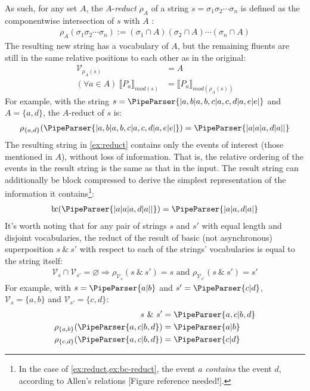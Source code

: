 \documentclass[a4paper,12pt,leqno]{article}
\newcommand{\bc}{{\rm b\!c}}
\newcommand{\vph}[1]{\vphantom{#1}}
\newcommand{\ebox}[1]{\fbox{$\vph{'(),}#1$}}
\renewcommand{\sp}{~\&~}
\renewcommand{\emptyset}{\varnothing}
\newcommand{\EventString}[1]{%
	\renewcommand*{\do}[1]{\ebox{##1}}%
	\PipeParser{#1}%
}
\newcommand{\refneeded}[1][]{{\color{red}[Figure reference needed!#1]}}
\begin{document}
As such, for any set $A$, the $A$-\textit{reduct} $\rho_A$ of a string $s=\sigma_1\sigma_2\cdots\sigma_n$ is defined as the componentwise intersection of $s$ with $A$ \citep{fernando2016regular,woods2018improving}:
\begin{align}
	\rho_A(\sigma_1\sigma_2\cdots\sigma_n) := (\sigma_1 \cap A)(\sigma_2 \cap A)\cdots(\sigma_n \cap A)
\end{align}
The resulting new string has a vocabulary of $A$, but the remaining fluents are still in the same relative positions to each other as in the original:
\begin{align}
	\mathcal{V}_{\rho_A(s)} &= A\\
	(\forall a \in A)~\llbracket P_a \rrbracket_{mod(s)} &= \llbracket P_a \rrbracket_{mod(\rho_A(s))}
\end{align}
For example, with the string $s = \EventString{{}|a,b|a,b,c|a,c,d|a,e|e|{}}$ and $A=\{a,d\}$, the $A$-reduct of $s$ is:
\begin{align}\label{ex:reduct}
	\rho_{\{a,d\}}(\EventString{{}|a,b|a,b,c|a,c,d|a,e|e|{}}) = \EventString{{}|a|a|a,d|a|{}|{}}
\end{align}
The resulting string in \cref{ex:reduct} contains only the events of interest (those mentioned in $A$), without loss of information. That is, the relative ordering of the events in the result string is the same as that in the input. The result string can additionally be block compressed to derive the simplest representation of the information it contains\footnote{In the case of \cref{ex:reduct,ex:bc-reduct}, the event $a$ \textit{contains} the event $d$, according to Allen's relations \citep{allen1983maintaining}\refneeded.}:
\begin{align}\label{ex:bc-reduct}
	\bc(\EventString{{}|a|a|a,d|a|{}|{}}) = \EventString{{}|a|a,d|a|{}}
\end{align}
It's worth noting that for any pair of strings $s$ and $s'$ with equal length and disjoint vocabularies, the reduct of the result of basic (not asynchronous) superposition $s \sp s'$ with respect to each of the strings' vocabularies is equal to the string itself:
\begin{align}\label{impl:disjoint-vocab-reduct}
	\mathcal{V}_{s} \cap \mathcal{V}_{s'} = \emptyset \Longrightarrow \rho_{\mathcal{V}_{s}}(s \sp s') = s \text{ and } \rho_{\mathcal{V}_{s'}}(s \sp s') = s'
\end{align}
For example, with $s = \EventString{a|b}$ and $s' = \EventString{c|d}$, $\mathcal{V}_s = \{a,b\}$ and $\mathcal{V}_{s'} = \{c,d\}$:
\begin{align}\label{ex:disjoint-vocab-reduct}
	s \sp s' &= \EventString{a,c|b,d}\\
	\rho_{\{a,b\}}(\EventString{a,c|b,d}) &= \EventString{a|b}\notag\\
	\rho_{\{c,d\}}(\EventString{a,c|b,d}) &= \EventString{c|d}\notag
\end{align}
\end{document}
